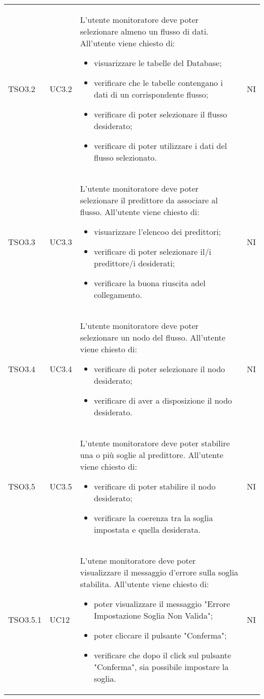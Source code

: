 \begin{longtable}{C{2.5cm} C{2.5cm} L{8cm} C{2cm}}
TSO3.2 &
UC3.2 &
L'utente monitoratore deve poter selezionare almeno un flusso di dati. All'utente viene chiesto di:
\begin{itemize}
	\item visuarizzare le tabelle del Database;
	\item verificare che le tabelle contengano i dati di un corrispondente flusso;
	\item verificare di poter selezionare il flusso desiderato;
	\item verificare di poter utilizzare i dati del flusso selezionato.
\end{itemize}&
NI \\

TSO3.3 &
UC3.3 &
L'utente monitoratore deve poter selezionare il predittore da associare al flusso. All'utente viene chiesto di:
\begin{itemize}
	\item visuarizzare l'elencoo dei predittori;
	\item verificare di poter selezionare il/i predittore/i desiderati;
	\item verificare la buona riuscita adel collegamento.
\end{itemize}&
NI \\

TSO3.4 &
UC3.4 &
L'utente monitoratore deve poter selezionare un nodo del flusso. All'utente viene chiesto di:
\begin{itemize}
	\item verificare di poter selezionare il nodo desiderato;
	\item verificare di aver a disposizione il nodo desiderato.
\end{itemize}&
NI \\

TSO3.5 &
UC3.5 &
L'utente monitoratore deve poter stabilire una o più soglie al predittore. All'utente viene chiesto di:
\begin{itemize}
	\item verificare di poter stabilire il nodo desiderato;
	\item verificare la coerenza tra la soglia impostata e quella desiderata.
\end{itemize}&
NI \\

TSO3.5.1 &
UC12 &
L'utene monitoratore deve poter visualizzare il messaggio d'errore sulla soglia stabilita. All'utente viene chiesto di:
\begin{itemize}
	\item poter visualizzare il messaggio "Errore Impostazione Soglia Non Valida";
	\item poter cliccare il pulsante "Conferma";
	\item verificare che dopo il click sul pulsante "Conferma", sia possibile impostare la soglia.
\end{itemize} &
NI \\


\end{longtable}
